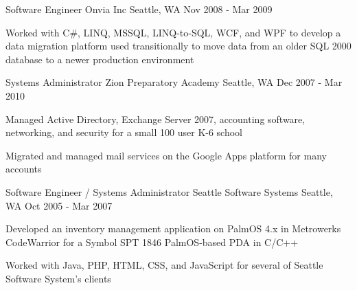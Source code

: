 \begin{cventries}
    \cventry
    {Software Engineer}
    {Onvia Inc}
    {Seattle, WA}
    {Nov 2008 - Mar 2009}
    {
        \begin{cvitems}
        \item {Worked with C\#, LINQ, MSSQL, LINQ-to-SQL, WCF, and WPF to develop a data migration platform used transitionally to move data from an older SQL 2000 database to a newer production environment}
        \end{cvitems}
    }

    \cventry
    {Systems Administrator} 
    {Zion Preparatory Academy} 
    {Seattle, WA} 
    {Dec 2007 - Mar 2010} 
    { 
        \begin{cvitems}
        \item {Managed Active Directory, Exchange Server 2007, accounting software, networking, and security for a small 100 user K-6 school}
        \item {Migrated and managed mail services on the Google Apps platform for many accounts}
        \end{cvitems}
    }

    \cventry
    {Software Engineer / Systems Administrator}
    {Seattle Software Systems} 
    {Seattle, WA} 
    {Oct 2005 - Mar 2007} 
    { 
        \begin{cvitems}
        \item {Developed an inventory management application on PalmOS 4.x in Metrowerks CodeWarrior for a Symbol SPT 1846 PalmOS-based PDA in C/C++}
        \item {Worked with Java, PHP, HTML, CSS, and JavaScript for several of Seattle Software System’s clients}
        \end{cvitems}
    }

\end{cventries}
